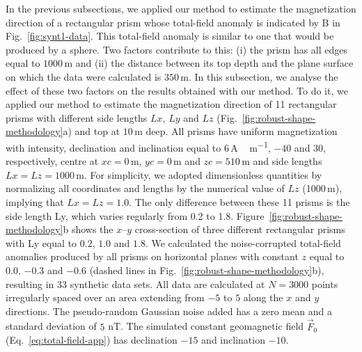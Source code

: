 \documentclass[journal abbreviation, npg]{copernicus}
\begin{document}
In the previous subsections, we applied our method to estimate the
magnetization direction of a rectangular prism whose total-field anomaly is
indicated by B in Fig.~\ref{fig:synt1-data}. This total-field anomaly is
similar to one that would be produced by a sphere. Two factors contribute to
this: (i) the prism has all edges equal to $1000$\,\unit{m} and (ii) the
distance between its top depth and the plane surface on which the data were
calculated is $350$\,\unit{m}. In this subsection, we analyse the effect of
these two factors on the results obtained with our method. To do it, we
applied our method to estimate the magnetization direction of 11 rectangular
prisms with different side lengths $Lx$, $Ly$ and $Lz$
(Fig.~\ref{fig:robust-shape-methodology}a) and top at $10$\,\unit{m} deep.
All prisms have uniform magnetization with intensity, declination and
inclination equal to $6$\,\unit{A\,m^{-1}}, $-40${\degree} and $30${\degree},
respectively, centre at $xc = 0$\,\unit{m}, $yc = 0$\,\unit{m} and $zc =
510$\,\unit{m} and side lengths $Lx=Lz=1000$\,\unit{m}. For simplicity, we
adopted dimensionless quantities by normalizing all coordinates and lengths
by the numerical value of $Lz$ (1000\,\unit{m}), implying that $Lx=Lz=1.0$.
The only difference between these 11 prisms is the side length Ly, which
varies regularly from 0.2 to 1.8. Figure~\ref{fig:robust-shape-methodology}b
shows the $x$--$y$ cross-section of three different rectangular prisms with
Ly equal to $0.2$, $1.0$ and $1.8$. We calculated the noise-corrupted
total-field anomalies produced by all prisms on horizontal planes with
constant $z$ equal to $0.0$, $-0.3$ and $-0.6$ (dashed lines in
Fig.~\ref{fig:robust-shape-methodology}b), resulting in $33$ synthetic data
sets. All data are calculated at $N = 3000$ points irregularly spaced over an
area extending from $-5$ to $5$ along the $x$ and $y$ directions. The
pseudo-random Gaussian noise added has a zero mean and a standard deviation
of $5$ nT. The simulated constant geomagnetic field $\vec{F}_{0}$
(Eq.~\ref{eq:total-field-app}) has declination $-15${\degree} and inclination
$-10${\degree}.
\end{document}
